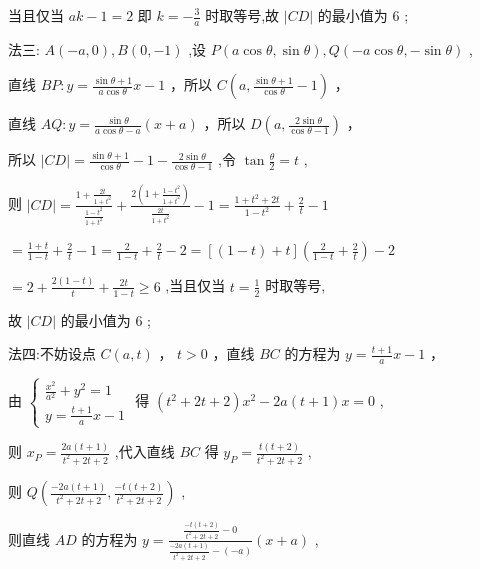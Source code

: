 \documentclass[10pt]{article}
\begin{document}
当且仅当 \({ak} - 1 = 2\) 即 \(k =  - \frac{3}{a}\) 时取等号,故 \(\left| {CD}\right|\) 的最小值为 6 ;

法三: \(A\left( {-a,0}\right) ,B\left( {0, - 1}\right)\) ,设 \(P\left( {a\cos \theta ,\sin \theta }\right) ,Q\left( {-a\cos \theta , - \sin \theta }\right)\) ,

直线 \({BP} : y = \frac{\sin \theta  + 1}{a\cos \theta }x - 1\) ，所以 \(C\left( {a,\frac{\sin \theta  + 1}{\cos \theta } - 1}\right)\) ，

直线 \({AQ} : y = \frac{\sin \theta }{a\cos \theta  - a}\left( {x + a}\right)\) ，所以 \(D\left( {a,\frac{2\sin \theta }{\cos \theta  - 1}}\right)\) ，

所以 \(\left| {CD}\right|  = \frac{\sin \theta  + 1}{\cos \theta } - 1 - \frac{2\sin \theta }{\cos \theta  - 1}\) ,令 \(\tan \frac{\theta }{2} = t\) ,

则 \(\left| {CD}\right|  = \frac{1 + \frac{2t}{1 + {t}^{2}}}{\frac{1 - {t}^{2}}{1 + {t}^{2}}} + \frac{2\left( {1 + \frac{1 - {t}^{2}}{1 + {t}^{2}}}\right) }{\frac{2t}{1 + {t}^{2}}} - 1 = \frac{1 + {t}^{2} + {2t}}{1 - {t}^{2}} + \frac{2}{t} - 1\)

\(= \frac{1 + t}{1 - t} + \frac{2}{t} - 1 = \frac{2}{1 - t} + \frac{2}{t} - 2 = \left\lbrack  {\left( {1 - t}\right)  + t}\right\rbrack  \left( {\frac{2}{1 - t} + \frac{2}{t}}\right)  - 2\)

\(= 2 + \frac{2\left( {1 - t}\right) }{t} + \frac{2t}{1 - t} \geq  6\) ,当且仅当 \(t = \frac{1}{2}\) 时取等号,

故 \(\left| {CD}\right|\) 的最小值为 6 ;

法四:不妨设点 \(C\left( {a,t}\right)\) ， \(t > 0\) ，直线 \({BC}\) 的方程为 \(y = \frac{t + 1}{a}x - 1\) ，

由 \(\left\{  \begin{array}{l} \frac{{x}^{2}}{{a}^{2}} + {y}^{2} = 1 \\  y = \frac{t + 1}{a}x - 1 \end{array}\right.\) 得 \(\left( {{t}^{2} + {2t} + 2}\right) {x}^{2} - {2a}\left( {t + 1}\right) x = 0\) ,

则 \({x}_{P} = \frac{{2a}\left( {t + 1}\right) }{{t}^{2} + {2t} + 2}\) ,代入直线 \({BC}\) 得 \({y}_{P} = \frac{t\left( {t + 2}\right) }{{t}^{2} + {2t} + 2}\) ,

则 \(Q\left( {\frac{-{2a}\left( {t + 1}\right) }{{t}^{2} + {2t} + 2},\frac{-t\left( {t + 2}\right) }{{t}^{2} + {2t} + 2}}\right)\) ,

则直线 \({AD}\) 的方程为 \(y = \frac{\frac{-t\left( {t + 2}\right) }{{t}^{2} + {2t} + 2} - 0}{\frac{-{2a}\left( {t + 1}\right) }{{t}^{2} + {2t} + 2} - \left( {-a}\right) }\left( {x + a}\right)\) ,
\end{document}
